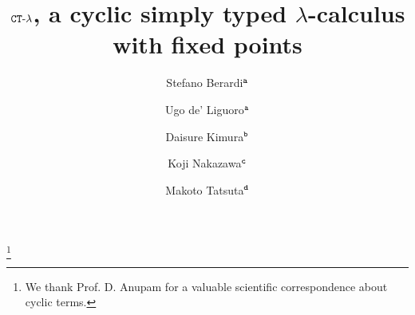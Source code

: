 \documentclass[twoside,11pt]{entics}
\begin{document}
\begin{frontmatter}

  \title{${ {\tt CT}\mbox{-}\lambda}$, a cyclic simply typed $\lambda$-calculus with fixed points} 						%
 \thanks[ALL]{We thank Prof. D. Anupam for a valuable scientific correspondence about cyclic terms.}   %
  \author{Stefano Berardi$^{\tt a}$}	%
   \author{Ugo de' Liguoro$^{\tt a}$}		%
    \author{Daisure Kimura$^{\tt b}$}
      \author{Koji Nakazawa$^{\tt c}$}
       \author{Makoto Tatsuta$^{\tt d}$}
   \address[a]{C.S. Dept., Turin University, Torino, Italy}  							
   \address[b]{Department of Information Science, Toho University, Japan} 
   \address[c]{Graduate School of Informatics, Nagoya University, Japan}
 \address[d]{National Institute of Informatics, Sokendai, Tokyo, Japan}
 
 


\end{frontmatter}
\end{document}
